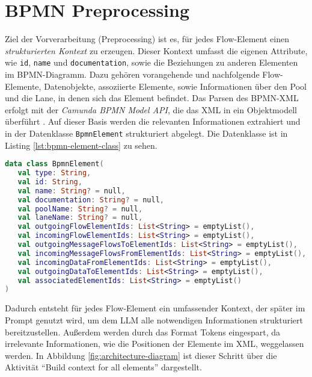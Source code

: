 \section{BPMN Preprocessing}\label{sec:bpmn-preprocessing}

Ziel der Vorverarbeitung (Preprocessing) ist es, für jedes Flow-Element einen \emph{strukturierten Kontext} zu erzeugen. Dieser Kontext umfasst die eigenen Attribute, wie \texttt{id}, \texttt{name} und \texttt{documentation}, sowie die Beziehungen zu anderen Elementen im \ac{BPMN}-Diagramm. Dazu gehören vorangehende und nachfolgende Flow-Elemente, Datenobjekte, assoziierte Elemente, sowie Informationen über den Pool und die Lane, in denen sich das Element befindet. Das Parsen des \ac{BPMN}-XML erfolgt mit der \emph{Camunda BPMN Model API}, die das XML in ein Objektmodell überführt \cite{camunda-bpmn-model-api, camunda-bpmn-model-read}. Auf dieser Basis werden die relevanten Informationen extrahiert und in der Datenklasse \texttt{BpmnElement} strukturiert abgelegt. Die Datenklasse ist in Listing \ref{lst:bpmn-element-class} zu sehen.

\begin{lstlisting}[language=Kotlin,caption={Interne \ac{BPMN}-Repräsentation je Flow-Element.},label={lst:bpmn-element-class}]
data class BpmnElement(
   val type: String,
   val id: String,
   val name: String? = null,
   val documentation: String? = null,
   val poolName: String? = null,
   val laneName: String? = null,
   val outgoingFlowElementIds: List<String> = emptyList(),
   val incomingFlowElementIds: List<String> = emptyList(),
   val outgoingMessageFlowsToElementIds: List<String> = emptyList(),
   val incomingMessageFlowsFromElementIds: List<String> = emptyList(),
   val incomingDataFromElementIds: List<String> = emptyList(),
   val outgoingDataToElementIds: List<String> = emptyList(),
   val associatedElementIds: List<String> = emptyList()
)
\end{lstlisting}

Dadurch entsteht für jedes Flow-Element ein umfassender Kontext, der später im Prompt genutzt wird, um dem \ac{LLM} alle notwendigen Informationen strukturiert bereitzustellen. Außerdem werden durch das Format Tokens eingespart, da irrelevante Informationen, wie die Positionen der Elemente im XML, weggelassen werden. In Abbildung \ref{fig:architecture-diagram} ist dieser Schritt über die Aktivität \enquote{Build context for all elements} dargestellt.